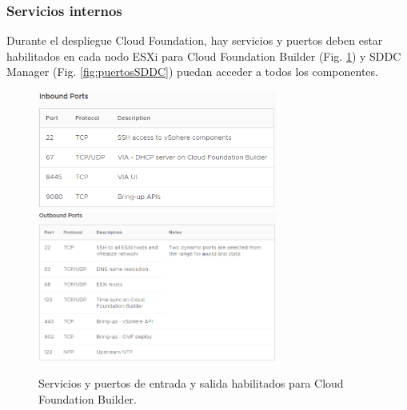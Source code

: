 \subsubsection{Servicios internos}
\label{subsubsec:servInterno}
Durante el despliegue Cloud Foundation, hay servicios y puertos deben estar habilitados en cada nodo ESXi para Cloud Foundation Builder (Fig. \ref{fig:puertosCB}) y SDDC Manager (Fig. \ref{fig:puertosSDDC}) puedan acceder a todos los componentes.
\iffalse
\begin{figure}[h!]
  \centering
  \includegraphics[width=0.7\textwidth]{imaxes/conceptosPrevios/puertosentradaCB.png}
  \includegraphics[width=0.7\textwidth]{imaxes/conceptosPrevios/puertossalidaCB.png}
  \caption{Servicios y puertos de entrada y salida habilitados para Cloud Foundation Builder.}
  \label{fig:puertosCB}
\end{figure}

